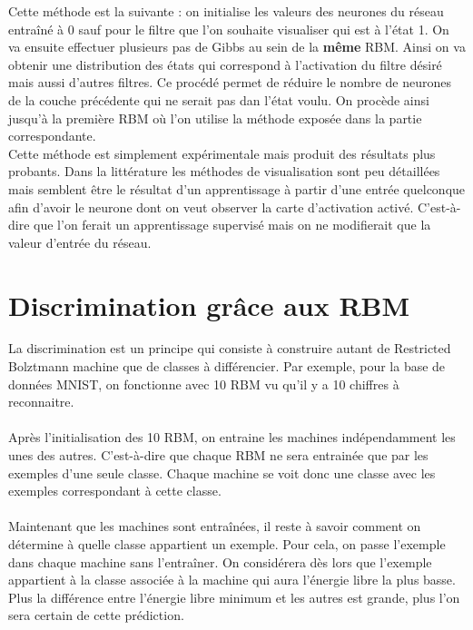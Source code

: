 \documentclass[a4paper,oneside]{report}
\begin{document}
Cette méthode est la suivante : on initialise les valeurs des neurones du réseau entraîné à 0 sauf pour le filtre que l'on souhaite visualiser qui est à l'état 1. On va ensuite effectuer plusieurs pas de Gibbs au sein de la \textbf{même} RBM. Ainsi on va obtenir une distribution des états qui correspond à l'activation du filtre désiré mais aussi d'autres filtres. Ce procédé permet de réduire le nombre de neurones de la couche précédente qui ne serait pas dan l'état voulu. On procède ainsi jusqu'à la première RBM où l'on utilise la méthode exposée dans la partie correspondante.\\

Cette méthode est simplement expérimentale mais produit des résultats plus probants. Dans la littérature les méthodes de visualisation sont peu détaillées mais semblent être le résultat d'un apprentissage à partir d'une entrée quelconque afin d'avoir le neurone dont on veut observer la carte d'activation activé. C'est-à-dire que l'on ferait un apprentissage supervisé mais on ne modifierait que la valeur d'entrée du réseau.


\section{Discrimination grâce aux RBM}

La discrimination est un principe qui consiste à construire autant de Restricted Bolztmann machine que de classes à différencier. Par exemple, pour la base de données MNIST, on fonctionne avec 10 RBM vu qu'il y a 10 chiffres à reconnaitre.

\paragraph{} Après l'initialisation des 10 RBM, on entraine les machines indépendamment les unes des autres. C'est-à-dire que chaque RBM ne sera entrainée que par les exemples d'une seule classe. Chaque machine se voit donc une classe avec les exemples correspondant à cette classe.

\paragraph{} Maintenant que les machines sont entraînées, il reste à savoir comment on détermine à quelle classe appartient un exemple. Pour cela, on passe l'exemple dans chaque machine sans l'entraîner. On considérera dès lors que l'exemple appartient à la classe associée à la machine qui aura l'énergie libre la plus basse. Plus la différence entre l'énergie libre minimum et les autres est grande, plus l'on sera certain de cette prédiction.\\
\end{document}
